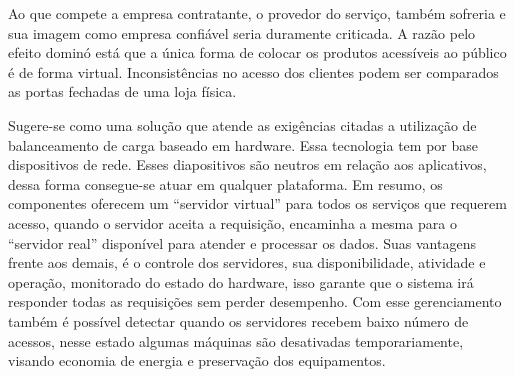 Ao que compete a empresa contratante, o provedor do serviço, também sofreria e sua imagem como empresa confiável seria
duramente criticada. A razão pelo efeito dominó está que a única forma de colocar os produtos acessíveis ao público é de
forma virtual. Inconsistências no acesso dos clientes podem ser comparados as portas fechadas de uma loja física.


Sugere-se como uma solução que atende as exigências citadas a utilização de balanceamento de carga baseado em hardware.
Essa tecnologia tem por base dispositivos de rede. Esses diapositivos são neutros em relação aos aplicativos, dessa forma
consegue-se atuar em qualquer plataforma. Em resumo, os componentes oferecem um “servidor virtual” para todos os serviços
que requerem acesso, quando o servidor aceita a requisição, encaminha a mesma para o “servidor real” disponível para atender
e processar os dados. Suas vantagens frente aos demais, é o controle dos servidores, sua disponibilidade, atividade e
operação, monitorado do estado do hardware, isso garante que o sistema irá responder todas as requisições sem perder
desempenho. Com esse gerenciamento também é possível detectar quando os servidores recebem baixo número de acessos, nesse
estado algumas máquinas são desativadas temporariamente, visando economia de energia e preservação dos equipamentos.

